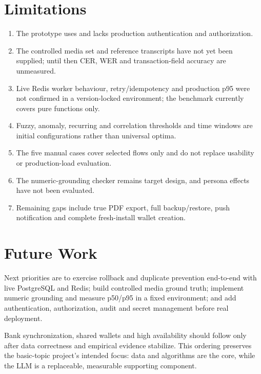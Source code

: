 \section{Limitations}

\begin{enumerate}
  \item The prototype uses  and lacks production authentication and authorization.
  \item The controlled media set and reference transcripts have not yet been supplied; until then CER, WER and transaction-field accuracy are unmeasured.
  \item Live Redis worker behaviour, retry/idempotency and production p95 were not confirmed in a version-locked environment; the benchmark currently covers pure functions only.
  \item Fuzzy, anomaly, recurring and correlation thresholds and time windows are initial configurations rather than universal optima.
  \item The five manual cases cover selected flows only and do not replace usability or production-load evaluation.
  \item The numeric-grounding checker remains target design, and persona effects have not been evaluated.
  \item Remaining gaps include true PDF export, full backup/restore, push notification and complete fresh-install wallet creation.
\end{enumerate}

\section{Future Work}

Next priorities are to exercise rollback and duplicate prevention end-to-end with live PostgreSQL and Redis; build controlled media ground truth; implement numeric grounding and measure p50/p95 in a fixed environment; and add authentication, authorization, audit and secret management before real deployment.

Bank synchronization, shared wallets and high availability should follow only after data correctness and empirical evidence stabilize. This ordering preserves the basic-topic project's intended focus: data and algorithms are the core, while the LLM is a replaceable, measurable supporting component.
